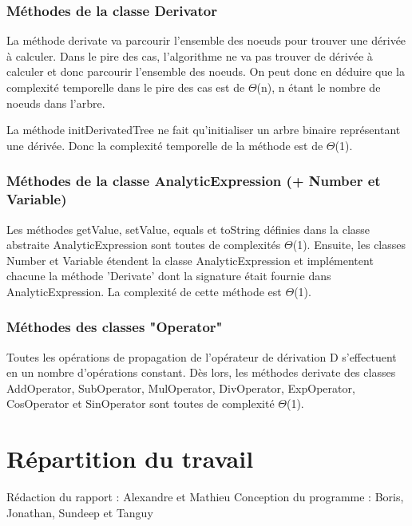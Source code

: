 \documentclass[11pt]{article}
\begin{document}
\subsubsection*{Méthodes de la classe Derivator}
La méthode derivate va parcourir l'ensemble des noeuds pour trouver une dérivée à calculer. Dans le pire des cas, l'algorithme ne va pas trouver de dérivée à calculer et donc parcourir l'ensemble des noeuds. On peut donc en déduire que la complexité temporelle dans le pire des cas est de $\Theta$(n), n étant le nombre de noeuds dans l'arbre.

La méthode initDerivatedTree ne fait qu'initialiser un arbre binaire représentant une dérivée. Donc la complexité temporelle de la méthode est de $\Theta$(1).

\subsubsection*{Méthodes de la classe AnalyticExpression (+ Number et Variable)}
Les méthodes getValue, setValue, equals et toString définies dans la classe abstraite AnalyticExpression sont toutes de complexités $\Theta$(1). Ensuite, les classes Number et Variable étendent la classe AnalyticExpression et implémentent chacune la méthode 'Derivate' dont la signature était fournie dans AnalyticExpression. La complexité de cette méthode est $\Theta$(1).

\subsubsection*{Méthodes des classes "Operator"}
Toutes les opérations de propagation de l'opérateur de dérivation D s'effectuent en un nombre d'opérations constant. Dès lors, les méthodes derivate des classes AddOperator, SubOperator, MulOperator, DivOperator, ExpOperator, CosOperator et SinOperator sont toutes de complexité $\Theta$(1).

\section{Répartition du travail}

Rédaction du rapport : Alexandre et Mathieu
Conception du programme : Boris, Jonathan, Sundeep et Tanguy
\end{document}
